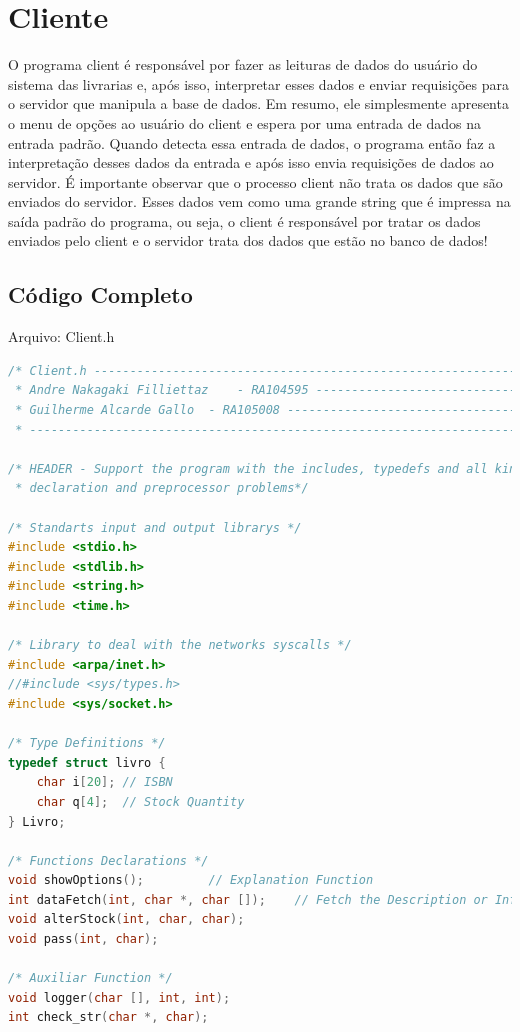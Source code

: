 \documentclass[10pt,a4paper]{report}
\begin{document}
\chapter{Cliente}
O programa client é responsável por fazer as leituras de dados do usuário do sistema das livrarias e, após isso, interpretar esses dados e enviar requisições para o servidor que manipula a base de dados.
Em resumo, ele simplesmente apresenta o menu de opções ao usuário do client e espera por uma entrada de dados na entrada padrão. Quando detecta essa entrada de dados, o programa então faz a interpretação desses dados da entrada e após isso envia requisições de dados ao servidor.
É importante observar que o processo client não trata os dados que são enviados do servidor. Esses dados vem como uma grande string que é impressa na saída padrão do programa, ou seja, o client é responsável por tratar os dados enviados pelo client e o servidor trata dos dados que estão no banco de dados!

\section*{Código Completo}
\begin{center}
Arquivo: Client.h
\end{center}
\begin{lstlisting}[language=C]
/* Client.h -------------------------------------------------------------------- 
 * Andre Nakagaki Filliettaz 	- RA104595 ------------------------------------- 
 * Guilherme Alcarde Gallo 	- RA105008 ------------------------------------- 
 * -------------------------------------------------------------------------- */ 

/* HEADER - Support the program with the includes, typedefs and all king of 
 * declaration and preprocessor problems*/ 

/* Standarts input and output librarys */ 
#include <stdio.h> 
#include <stdlib.h> 
#include <string.h> 
#include <time.h> 

/* Library to deal with the networks syscalls */ 
#include <arpa/inet.h> 
//#include <sys/types.h> 
#include <sys/socket.h> 

/* Type Definitions */ 
typedef struct livro { 
	char i[20];	// ISBN 
	char q[4];	// Stock Quantity 
} Livro; 

/* Functions Declarations */ 
void showOptions();			// Explanation Function 
int dataFetch(int, char *, char []);	// Fetch the Description or Infos 
void alterStock(int, char, char); 
void pass(int, char); 

/* Auxiliar Function */ 
void logger(char [], int, int);
int check_str(char *, char); 
\end{lstlisting}
\end{document}
